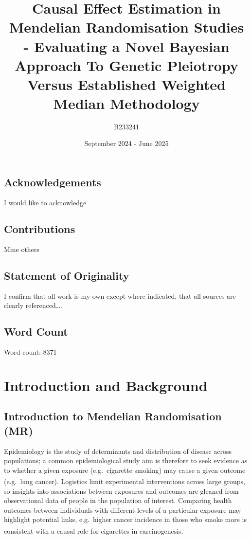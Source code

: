 \documentclass[
]{article}
\title{Causal Effect Estimation in Mendelian Randomisation Studies - Evaluating a Novel Bayesian Approach To Genetic Pleiotropy Versus Established Weighted Median Methodology}
\author{B233241}
\date{September 2024 - June 2025}
\begin{document}
\maketitle

{
\hypersetup{linkcolor=}
\setcounter{tocdepth}{2}
\tableofcontents
}
\newpage

\subsection*{Acknowledgements}\label{acknowledgements}

I would like to acknowledge

\subsection*{Contributions}\label{contributions}

Mine others

\subsection*{Statement of Originality}\label{statement-of-originality}

I confirm that all work is my own except where indicated, that all sources are clearly referenced\ldots.

\subsection*{Word Count}\label{word-count}

Word count:
8371

\newpage

\section{Introduction and Background}\label{introduction-and-background}

\subsection{Introduction to Mendelian Randomisation (MR)}\label{introduction-to-mendelian-randomisation-mr}

Epidemiology is the study of determinants and distribution of disease across populations; a common epidemiological study aim is therefore to seek evidence as to whether a given exposure (e.g.~cigarette smoking) may cause a given outcome (e.g.~lung cancer)\textsuperscript{}. Logistics limit experimental interventions across large groups, so insights into associations between exposures and outcomes are gleaned from observational data of people in the population of interest. Comparing health outcomes between individuals with different levels of a particular exposure may highlight potential links, e.g.~higher cancer incidence in those who smoke more is consistent with a causal role for cigarettes in carcinogenesis\textsuperscript{}.
\end{document}
